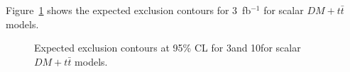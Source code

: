 \clearpage
Figure~\ref{fig:limits_DMtt_S} shows the expected exclusion contours for  3~fb$^{-1}$ for scalar $DM+t\bar{t}$ models. 

\begin{figure}[h!]
  \centering
  \caption{\label{fig:limits_DMtt_S} Expected exclusion contours at 95\% CL for 3\fbinv and 10\fbinv for  scalar $DM+t\bar{t}$ models. }
\end{figure}


